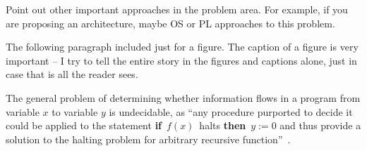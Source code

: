 
Point out other important approaches in the problem area. For example, if you 
are proposing an architecture, maybe OS or PL approaches to this problem. 

The following paragraph included just for a figure. The caption of a figure is very
important -- I try to tell the entire story in the figures and captions alone, 
just in case that is all the reader sees.

The general problem of determining whether information flows in a program from
variable $x$ to variable $y$ is undecidable, as ``any procedure purported to
decide it could be applied to the statement {\bf if}~$f(x)$~halts {\bf then}~$y
:= 0$ and thus provide a solution to the halting problem for arbitrary
recursive function''~\cite{denning-impossible}.  

